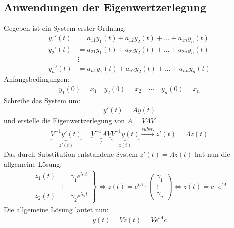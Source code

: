 \documentclass[a4paper,twocolumn]{article}
\begin{document}
	\subsection{Anwendungen der Eigenwertzerlegung}
		\begin{fmerke}
			Gegeben ist ein System erster Ordnung:
			\begin{align*}
				y_1'(t) &= a_{11}y_1(t)+a_{12}y_2(t)+...+a_{1n}y_n(t) \\
				y_2'(t) &= a_{21}y_1(t)+a_{22}y_2(t)+...+a_{2n}y_n(t) \\
						&\vdots \\
				y_n'(t) &= a_{n1}y_1(t)+a_{n2}y_2(t)+...+a_{nn}y_n(t) 
			\end{align*}
			Anfangsbedingungen:
			\begin{align*}
				y_1(0)=x_1 \quad y_2(0)=x_2 \quad \cdots \quad y_n(0)=x_n
			\end{align*}
			Schreibe das System um:
			\begin{align*}
				y'(t)=Ay(t)
			\end{align*}
			und erstelle die Eigenwertzerlegung von $A=V\Lambda V$
			\begin{align*}
				\underbrace{V^{-1}y'(t)}_{z'(t)}=\underbrace{V^{-1}AV}_{\Lambda} \underbrace{V^{-1}y(t)}_{z(t)}
				\xrightarrow{subst.} z'(t) = \Lambda z(t) 
			\end{align*}
			Das durch Substitution entstandene System $z'(t)=\Lambda z(t)$ hat nun die allgemeine Lösung:
			\begin{align*}
				\left. 
				\begin{array}{rl}
				z_1(t) &= \gamma_1 e^{\lambda_1 t}\\
					&\vdots	\\
				z_2(t) &= \gamma_2 e^{\lambda_n t}
				\end{array} 
				\right\rbrace 
				\Longleftrightarrow z(t) = e^{t\Lambda} \cdot
				\left( 
					\begin{array}{c}
						\gamma_1\\
						\vdots \\ 
						\gamma_n 
					\end{array} 
				\right)
				\Longleftrightarrow z(t) = c\cdot e^{t\Lambda}
			\end{align*}
			Die allgemeine Lösung lautet nun:
			\begin{align*}
				y(t) = Vz(t)=Ve^{t\Lambda}c
			\end{align*}
			
		\end{fmerke}
\end{document}
